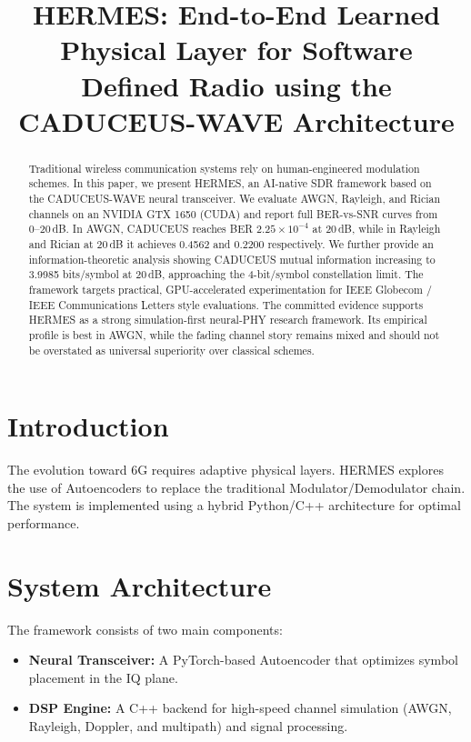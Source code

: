 \documentclass[10pt,journal,compsoc]{IEEEtran}
\title{HERMES: End-to-End Learned Physical Layer for Software Defined Radio using the CADUCEUS-WAVE Architecture}
\author{\IEEEauthorblockN{George David Tsitlauri}
\IEEEauthorblockA{\textit{Dept. of Informatics \& Telecommunications}\\
\textit{University of Thessaly, Greece}\\
gdtsitlauri@gmail.com}}
\begin{document}
\maketitle

\begin{abstract}
Traditional wireless communication systems rely on human-engineered modulation schemes. In this paper, we present HERMES, an AI-native SDR framework based on the CADUCEUS-WAVE neural transceiver. We evaluate AWGN, Rayleigh, and Rician channels on an NVIDIA GTX 1650 (CUDA) and report full BER-vs-SNR curves from 0--20\,dB. In AWGN, CADUCEUS reaches BER $2.25\times10^{-4}$ at 20\,dB, while in Rayleigh and Rician at 20\,dB it achieves 0.4562 and 0.2200 respectively. We further provide an information-theoretic analysis showing CADUCEUS mutual information increasing to 3.9985 bits/symbol at 20\,dB, approaching the 4-bit/symbol constellation limit. The framework targets practical, GPU-accelerated experimentation for IEEE Globecom / IEEE Communications Letters style evaluations.
The committed evidence supports HERMES as a strong simulation-first neural-PHY
research framework. Its empirical profile is best in AWGN, while the fading
channel story remains mixed and should not be overstated as universal
superiority over classical schemes.
\end{abstract}

\section{Introduction}
The evolution toward 6G requires adaptive physical layers. HERMES explores the use of Autoencoders to replace the traditional Modulator/Demodulator chain. The system is implemented using a hybrid Python/C++ architecture for optimal performance.

\section{System Architecture}
The framework consists of two main components:
\begin{itemize}
    \item \textbf{Neural Transceiver:} A PyTorch-based Autoencoder that optimizes symbol placement in the IQ plane.
    \item \textbf{DSP Engine:} A C++ backend for high-speed channel simulation (AWGN, Rayleigh, Doppler, and multipath) and signal processing.
\end{itemize}
\end{document}
